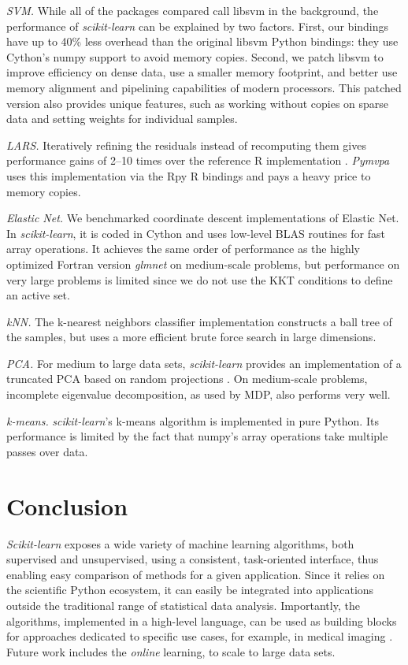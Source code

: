 \documentclass[twoside,11pt]{article}
\begin{document}
\noindent\emph{SVM.}
%
While all of the packages compared call libsvm in the
background, the
performance of \emph{scikit-learn} can be explained by two factors.
First, our bindings have up to 40\% less overhead than the original
libsvm Python bindings: they use Cython's numpy support
to avoid memory copies. Second, we patch libsvm to improve efficiency
on dense data, use a smaller memory footprint, and better use memory
alignment and pipelining capabilities of modern processors. This patched
version also provides unique features, such as working without copies on
sparse data and setting weights for individual samples.


\noindent\emph{LARS.}
%
Iteratively refining the residuals instead of recomputing them gives
performance gains of 2--10 times over the reference R implementation
\citep{LARS}. {\sl Pymvpa} uses this implementation via the Rpy R
bindings and pays a heavy price to memory copies.


\noindent\emph{Elastic Net.}
%
We benchmarked coordinate descent implementations of Elastic Net.  In
\noindent\emph{scikit-learn}, it is coded in Cython and uses low-level BLAS
routines for fast array operations. It achieves the same order of
performance as the highly optimized Fortran version \emph{glmnet}
\citep{friedman2010} on medium-scale problems, but performance on very
large problems is limited since we do not use the KKT conditions to
define an active set.

\noindent\emph{kNN.}
%
The k-nearest neighbors classifier implementation constructs a ball
tree \citep{omohundro1989} of the samples, but uses a more
efficient brute force search in large dimensions.

\noindent\emph{PCA.}
%
For medium to large data sets, \emph{scikit-learn} provides an
implementation of a truncated PCA based on random projections
\citep{rokhlin2009}. On medium-scale problems, incomplete eigenvalue
decomposition, as used by MDP, also performs very well.

\noindent\emph{k-means.}
%
\noindent\emph{scikit-learn}'s k-means algorithm is implemented in pure
Python.  Its performance is limited by the fact that numpy's
array operations take multiple passes over data.

\section{Conclusion}

\emph{Scikit-learn} exposes a wide variety of machine learning
algorithms, both supervised and unsupervised, using a consistent,
task-oriented interface, thus enabling easy comparison of methods for a
given application.
%
Since it relies on the scientific Python ecosystem, it can easily be
integrated into applications outside the traditional range of statistical
data analysis. Importantly, the algorithms, implemented in a high-level
language, can be used as building blocks for approaches dedicated to
specific use cases, for example, in medical imaging \citep{Michel2011}.
%
Future work includes the \emph{online} learning, to scale to
large data sets.


\end{document}
